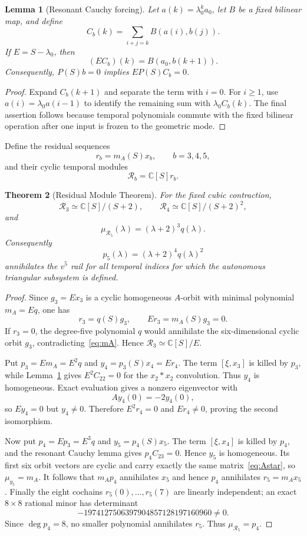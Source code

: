 \documentclass[11pt]{amsart}
\newtheorem{theorem}{Theorem}[section]
\newtheorem{lemma}[theorem]{Lemma}
\newcommand{\C}{\mathbb C}
\begin{document}
\begin{lemma}[Resonant Cauchy forcing]\label{lem:cauchy-resonance}
Let $a(k)=\lambda_0^ka_0$, let $B$ be a fixed bilinear map, and define
\[
C_b(k)=\sum_{i+j=k}B(a(i),b(j)).
\]
If $E=S-\lambda_0$, then
\[
(EC_b)(k)=B(a_0,b(k+1)).
\]
Consequently, $P(S)b=0$ implies $EP(S)C_b=0$.
\end{lemma}

\begin{proof}
Expand $C_b(k+1)$ and separate the term with $i=0$.  For $i\ge1$, use $a(i)=\lambda_0a(i-1)$ to identify the remaining sum with $\lambda_0C_b(k)$.  The final assertion follows because temporal polynomials commute with the fixed bilinear operation after one input is frozen to the geometric mode.
\end{proof}

Define the residual sequences
\[
r_b=m_A(S)x_b,
\qquad b=3,4,5,
\]
and their cyclic temporal modules
\[
\mathcal R_b=\C[S]r_b.
\]

\begin{theorem}[Residual Module Theorem]\label{thm:residual-modules}
For the fixed cubic contraction,
\[
\boxed{
\mathcal R_3\simeq \C[S]/(S+2),
\qquad
\mathcal R_4\simeq \C[S]/(S+2)^2,
}
\]
and
\[
\boxed{
\mu_{\mathcal R_5}(\lambda)=(\lambda+2)^3q(\lambda).
}
\]
Consequently
\[
\boxed{
p_5(\lambda)=(\lambda+2)^4q(\lambda)^2
}
\]
annihilates the $v^5$ rail for all temporal indices for which the autonomous triangular subsystem is defined.
\end{theorem}

\begin{proof}
Since $g_3=Ex_3$ is a cyclic homogeneous $A$-orbit with minimal polynomial $m_A=Eq$, one has
\[
r_3=q(S)g_3,
\qquad
Er_3=m_A(S)g_3=0.
\]
If $r_3=0$, the degree-five polynomial $q$ would annihilate the six-dimensional cyclic orbit $g_3$, contradicting~\eqref{eq:mA}.  Hence $\mathcal R_3\simeq\C[S]/E$.

Put $p_3=Em_A=E^2q$ and $y_4=p_3(S)x_4=Er_4$.  The term $[\xi,x_3]$ is killed by $p_3$, while Lemma~\ref{lem:cauchy-resonance} gives $E^2C_{22}=0$ for the $x_2*x_2$ convolution.  Thus $y_4$ is homogeneous.  Exact evaluation gives a nonzero eigenvector with
\[
Ay_4(0)=-2y_4(0),
\]
so $Ey_4=0$ but $y_4\neq0$.  Therefore $E^2r_4=0$ and $Er_4\neq0$, proving the second isomorphism.

Now put $p_4=Ep_3=E^3q$ and $y_5=p_4(S)x_5$.  The term $[\xi,x_4]$ is killed by $p_4$, and the resonant Cauchy lemma gives $p_4C_{23}=0$.  Hence $y_5$ is homogeneous.  Its first six orbit vectors are cyclic and carry exactly the same matrix~\eqref{eq:Astar}, so $\mu_{y_5}=m_A$.  It follows that $m_Ap_4$ annihilates $x_5$ and hence $p_4$ annihilates $r_5=m_Ax_5$.  Finally the eight cochains $r_5(0),\ldots,r_5(7)$ are linearly independent; an exact $8\times8$ rational minor has determinant
\[
-1974127506397904857128197160960\neq0.
\]
Since $\deg p_4=8$, no smaller polynomial annihilates $r_5$.  Thus $\mu_{\mathcal R_5}=p_4$.
\end{proof}
\end{document}
